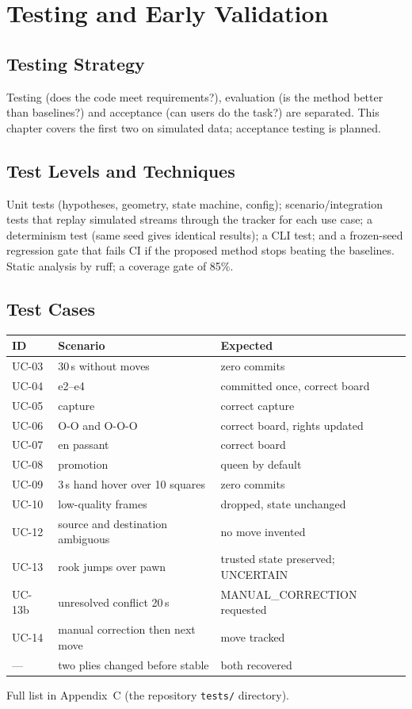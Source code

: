 \chapter{Testing and Early Validation}
\section{Testing Strategy}
Testing (does the code meet requirements?), evaluation (is the method better than baselines?) and acceptance (can
users do the task?) are separated. This chapter covers the first two on simulated data; acceptance testing is planned.

\section{Test Levels and Techniques}
Unit tests (hypotheses, geometry, state machine, config); scenario/integration tests that replay simulated
streams through the tracker for each use case; a determinism test (same seed gives identical results); a CLI test;
and a frozen-seed regression gate that fails CI if the proposed method stops beating the baselines. Static analysis
by ruff; a coverage gate of 85\%.

\section{Test Cases}
\begin{longtable}{p{}p{}p{}}
\toprule ID & Scenario & Expected\\ \midrule
UC-03 & 30\,s without moves & zero commits\\
UC-04 & e2--e4 & committed once, correct board\\
UC-05 & capture & correct capture\\
UC-06 & O-O and O-O-O & correct board, rights updated\\
UC-07 & en passant & correct board\\
UC-08 & promotion & queen by default\\
UC-09 & 3\,s hand hover over 10 squares & zero commits\\
UC-10 & low-quality frames & dropped, state unchanged\\
UC-12 & source and destination ambiguous & no move invented\\
UC-13 & rook jumps over pawn & trusted state preserved; UNCERTAIN\\
UC-13b & unresolved conflict 20\,s & MANUAL\_CORRECTION requested\\
UC-14 & manual correction then next move & move tracked\\
--- & two plies changed before stable & both recovered\\
\bottomrule
\end{longtable}
Full list in Appendix~C (the repository \texttt{tests/} directory).

